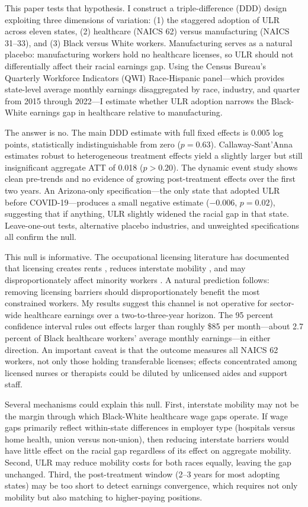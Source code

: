 \documentclass[12pt]{article}
\begin{document}
This paper tests that hypothesis. I construct a triple-difference (DDD) design exploiting three dimensions of variation: (1) the staggered adoption of ULR across eleven states, (2) healthcare (NAICS 62) versus manufacturing (NAICS 31--33), and (3) Black versus White workers. Manufacturing serves as a natural placebo: manufacturing workers hold no healthcare licenses, so ULR should not differentially affect their racial earnings gap. Using the Census Bureau's Quarterly Workforce Indicators (QWI) Race-Hispanic panel---which provides state-level average monthly earnings disaggregated by race, industry, and quarter from 2015 through 2022---I estimate whether ULR adoption narrows the Black-White earnings gap in healthcare relative to manufacturing.

The answer is no. The main DDD estimate with full fixed effects is 0.005 log points, statistically indistinguishable from zero ($p = 0.63$). Callaway-Sant'Anna estimates robust to heterogeneous treatment effects yield a slightly larger but still insignificant aggregate ATT of 0.018 ($p > 0.20$). The dynamic event study shows clean pre-trends and no evidence of growing post-treatment effects over the first two years. An Arizona-only specification---the only state that adopted ULR before COVID-19---produces a small negative estimate ($-0.006$, $p = 0.02$), suggesting that if anything, ULR slightly widened the racial gap in that state. Leave-one-out tests, alternative placebo industries, and unweighted specifications all confirm the null.

This null is informative. The occupational licensing literature has documented that licensing creates rents \citep{kleiner2006licensing, kleiner2013krueger}, reduces interstate mobility \citep{johnson2020licensing}, and may disproportionately affect minority workers \citep{blair2020licensing}. A natural prediction follows: removing licensing barriers should disproportionately benefit the most constrained workers. My results suggest this channel is not operative for sector-wide healthcare earnings over a two-to-three-year horizon. The 95 percent confidence interval rules out effects larger than roughly \$85 per month---about 2.7 percent of Black healthcare workers' average monthly earnings---in either direction. An important caveat is that the outcome measures all NAICS 62 workers, not only those holding transferable licenses; effects concentrated among licensed nurses or therapists could be diluted by unlicensed aides and support staff.

Several mechanisms could explain this null. First, interstate mobility may not be the margin through which Black-White healthcare wage gaps operate. If wage gaps primarily reflect within-state differences in employer type (hospitals versus home health, union versus non-union), then reducing interstate barriers would have little effect on the racial gap regardless of its effect on aggregate mobility. Second, ULR may reduce mobility costs for both races equally, leaving the gap unchanged. Third, the post-treatment window (2--3 years for most adopting states) may be too short to detect earnings convergence, which requires not only mobility but also matching to higher-paying positions.
\end{document}

